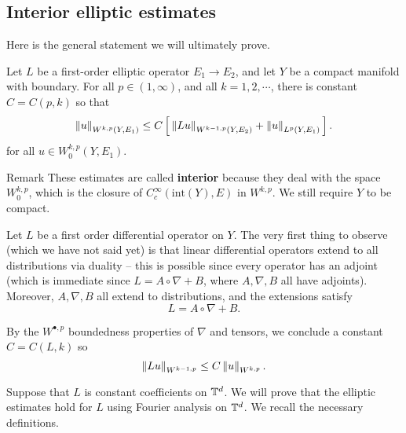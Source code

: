 \documentclass{amsart}
\begin{document}
  \subsection*{Interior elliptic estimates}
  Here is the general statement we will ultimately prove.
  \begin{thm}
    Let $L$ be a first-order elliptic operator $E_{1}\to E_{2}$, and let $Y$ be a compact manifold with boundary. For all $p\in (1,\infty)$, and all $k=1,2,\cdots$, there is constant $C=C(p,k)$ so that
    \begin{equation*}
      \left\lVert u\right\rVert_{W^{k,p}(Y,E_{1})}\le C\left[\,\left\lVert L u\right\rVert_{W^{k-1,p}(Y,E_{2})}+\left\lVert u\right\rVert_{L^{p}(Y,E_{1})}\,\right].
    \end{equation*}
    for all $u\in W^{k,p}_{0}(Y,E_{1})$. 
  \end{thm}
  \begin{clear}{Remark}
    These estimates are called \textbf{interior} because they deal with the space $W^{k,p}_{0}$, which is the closure of $C^{\infty}_{c}(\text{int}(Y),E)$ in $W^{k,p}$. We still require $Y$ to be compact.
  \end{clear}
  \begin{xca}
    Let $L$ be a first order differential operator on $Y$. The very first thing to observe (which we have not said yet) is that linear differential operators extend to all distributions via duality -- this is possible since every operator has an adjoint (which is immediate since $L=A\circ \nabla+B$, where $A,\nabla,B$ all have adjoints). Moreover, $A,\nabla,B$ all extend to distributions, and the extensions satisfy
    \begin{equation*}
      L=A\circ \nabla+B.
    \end{equation*}

    By the $W^{\bullet,p}$ boundedness properties of $\nabla$ and tensors, we conclude a constant $C=C(L,k)$ so
    \begin{equation*}
      \left\lVert Lu\right\rVert_{W^{k-1,p}}\le C\left\lVert u\right\rVert_{W^{k,p}}.
    \end{equation*}
  \end{xca}

  Suppose that $L$ is constant coefficients on $\mathbb{T}^{d}$. We will prove that the elliptic estimates hold for $L$ using Fourier analysis on $\mathbb{T}^{d}$. We recall the necessary definitions.
\end{document}
